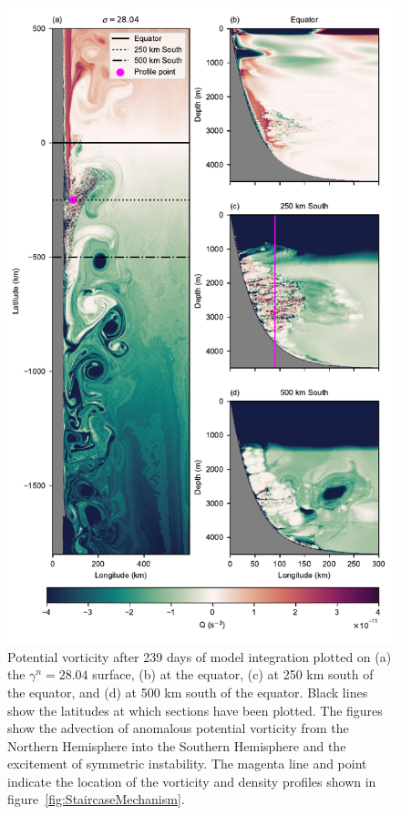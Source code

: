 \begin{figure}[hp]
    \centering
    \includegraphics{../figures/Figure4.pdf}
    \caption{Potential vorticity after 239 days of model integration plotted on (a) the $\gamma^n = 28.04$ surface, (b) at the equator, (c) at 250 km south of the equator, and (d) at 500 km south of the equator. Black lines show the latitudes at which sections have been plotted. The figures show the advection of anomalous potential vorticity from the Northern Hemisphere into the Southern Hemisphere and the excitement of symmetric instability. The magenta line and point indicate the location of the vorticity and density profiles shown in figure~\ref{fig:StaircaseMechanism}.}
    \label{fig:PV}
\end{figure}

